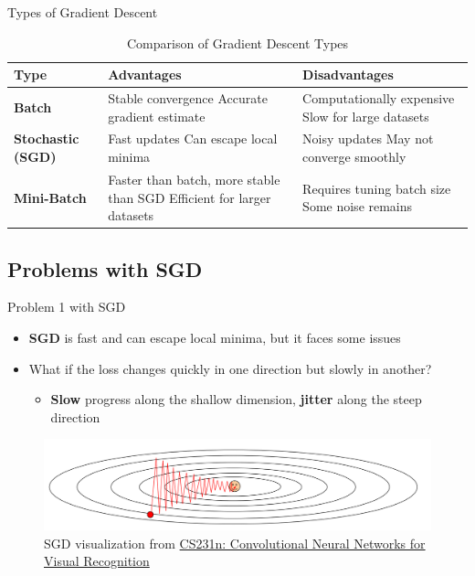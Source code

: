 \documentclass[serif, aspectratio=169]{beamer}
\begin{document}
\begin{frame}{Types of Gradient Descent}
\begin{table}[h!]
\centering
\begin{tabularx}{\textwidth}{@{} lX X @{}}
\toprule
\textbf{Type} & \textbf{Advantages} & \textbf{Disadvantages} \\ 
\midrule
\textbf{Batch}   & 
Stable convergence \newline 
Accurate gradient estimate  & 
Computationally expensive \newline 
Slow for large datasets \\ 
\midrule
\textbf{Stochastic (SGD)}   & 
Fast updates \newline 
Can escape local minima & 
Noisy updates \newline 
May not converge smoothly \\ 
\midrule
\textbf{Mini-Batch}   & 
Faster than batch, more stable than SGD \newline 
Efficient for larger datasets & 
Requires tuning batch size \newline 
Some noise remains \\ 
\bottomrule
\end{tabularx}
\caption{Comparison of Gradient Descent Types}
\end{table}
\end{frame}

\subsection{Problems with SGD}
\begin{frame}{Problem 1 with SGD}
    \begin{itemize}
        \item \textbf{SGD} is fast and can escape local minima, but it faces some issues
        \item What if the loss changes quickly in one direction but slowly in another?
        \begin{itemize}
            \item \textbf{Slow} progress along the shallow dimension, \textbf{jitter} along the steep direction
        \end{itemize}
    \end{itemize}
    \hfill
    \hfill
    \begin{center}
        \begin{figure}
            \includegraphics[width=1\linewidth]{pic/sgd_stanford.png}
            \caption{SGD visualization from \url{CS231n: Convolutional Neural Networks for Visual Recognition}}
        \end{figure}
    \end{center}
\end{frame}
\end{document}
